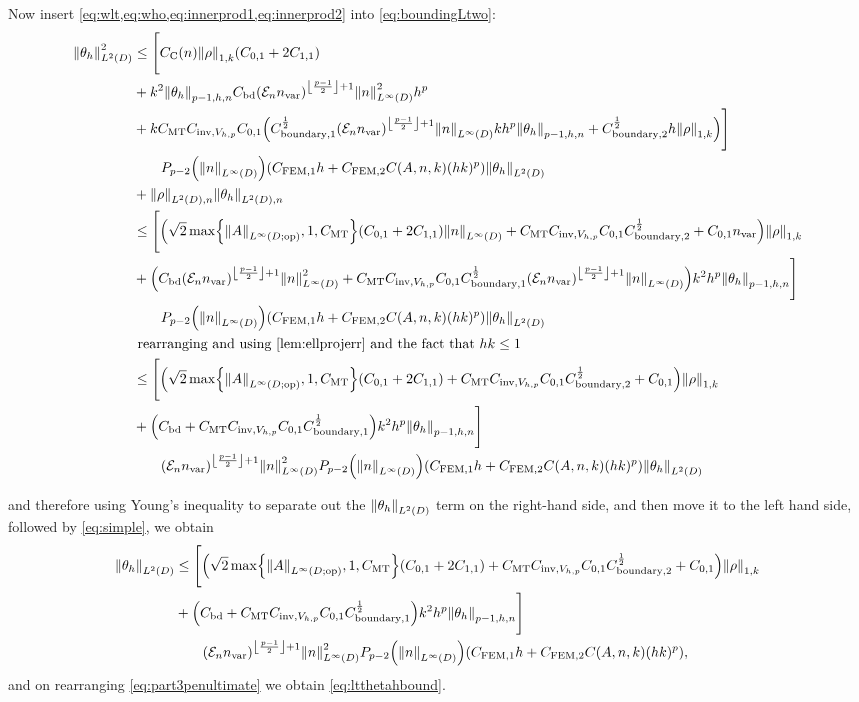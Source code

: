 Now insert \cref{eq:wlt,eq:who,eq:innerprod1,eq:innerprod2} into \cref{eq:boundingLtwo}:
\begin{align*}
\NLtD{\thetah}^2 &\leq \Bigg[\Cc \NW{\rho} \mleft(\Cfn{0,1} + 2\Cfn{1,1}\mright)\\
&+k^2\Nfn{p-1,h,n}{\thetah}  \Cfourteen \mleft(\En \nvar\mright)^{\floor{\frac{p-1}2}+1}\NLiD{n}^2 h^p \\
&+k\CMT \CinvVhp \Cfn{0,1} \mleft(\Cboundaryo^{\half} \mleft(\En\nvar\mright)^{\floor{\frac{p-1}2}+1}\NLiD{n} k h^{p} \Nfn{p-1,h,n}{\thetah} + \Cboundaryt^{\half} h \NW{\rho}\mright)\Bigg]\nonumber\\
&\quad\quad \Pfn{p-2}\mleft(\NLiD{n}\mright)\mleft(\CFEMotilde h + \CFEMttilde \CAnk (hk)^p\mright)\NLtD{\thetah}\\
&+\NLtDn{\rho}\NLtDn{\thetah}\nonumber\\
&\leq \Bigg[\mleft(\sqrt{2}\max\set{\NLiDop{A},1,\CMT}\mleft(\Cfn{0,1} + 2\Cfn{1,1}\mright)\NLiD{n} + \CMT \CinvVhp \Cfn{0,1} \Cboundaryt^{\half} + \Cfn{0,1}\nvar  \mright)\NW{\rho} \\
&+\mleft(  \Cfourteen \mleft(\En \nvar\mright)^{\floor{\frac{p-1}2}+1}\NLiD{n}^2 + \CMT \CinvVhp \Cfn{0,1}\Cboundaryo^{\half} \mleft(\En\nvar\mright)^{\floor{\frac{p-1}2}+1}\NLiD{n}\mright)k^2h^p\Nfn{p-1,h,n}{\thetah}\Bigg]\nonumber\\
&\quad\quad \Pfn{p-2}\mleft(\NLiD{n}\mright)\mleft(\CFEMotilde h + \CFEMttilde \CAnk (hk)^p\mright)\NLtD{\thetah}\nonumber\\
&\text{ rearranging and using \cref{lem:ellprojerr} and the fact that $hk \leq 1$}\nonumber\\
&\leq \Bigg[\mleft(\sqrt{2}\max\set{\NLiDop{A},1,\CMT}\mleft(\Cfn{0,1} + 2\Cfn{1,1}\mright) + \CMT \CinvVhp \Cfn{0,1} \Cboundaryt^{\half} + \Cfn{0,1}  \mright)\NW{\rho} \nonumber\\
&+\mleft(  \Cfourteen  + \CMT \CinvVhp \Cfn{0,1}\Cboundaryo^{\half} \mright)k^2h^p\Nfn{p-1,h,n}{\thetah}\Bigg]\nonumber\\
&\quad\quad \mleft(\En \nvar\mright)^{\floor{\frac{p-1}2}+1}\NLiD{n}^2\Pfn{p-2}\mleft(\NLiD{n}\mright)\mleft(\CFEMotilde h + \CFEMttilde \CAnk (hk)^p\mright)\NLtD{\thetah}\nonumber\\
\end{align*}


and therefore using Young's inequality to separate out the $\NLtD{\thetah}$ term on the right-hand side, and then move it to the left hand side, followed by \cref{eq:simple}, we obtain
\begin{align}
\NLtD{\thetah}&\leq \Bigg[\mleft(\sqrt{2}\max\set{\NLiDop{A},1,\CMT}\mleft(\Cfn{0,1} + 2\Cfn{1,1}\mright) + \CMT \CinvVhp \Cfn{0,1} \Cboundaryt^{\half} + \Cfn{0,1}  \mright)\NW{\rho}\nonumber \\
&+\mleft(  \Cfourteen  + \CMT \CinvVhp \Cfn{0,1}\Cboundaryo^{\half} \mright)k^2h^p\Nfn{p-1,h,n}{\thetah}\Bigg]\nonumber\\
&\quad\quad \mleft(\En \nvar\mright)^{\floor{\frac{p-1}2}+1}\NLiD{n}^2\Pfn{p-2}\mleft(\NLiD{n}\mright)\mleft(\CFEMotilde h + \CFEMttilde \CAnk (hk)^p\mright)\label{eq:part3penultimate},
\end{align}
and on rearranging \cref{eq:part3penultimate} we obtain \cref{eq:ltthetahbound}.

